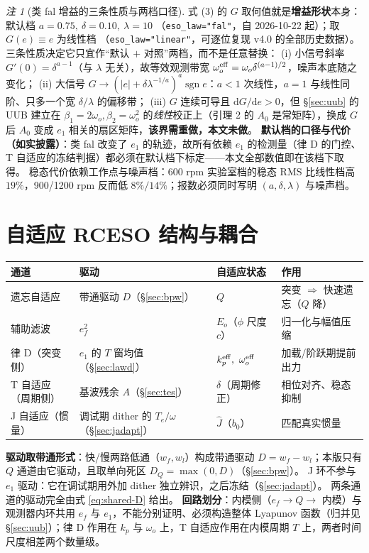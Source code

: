 \documentclass[11pt,a4paper]{article}
\theoremstyle{remark}\newtheorem{remark}{注}
\newcommand{\ef}{e_f}
\begin{document}
\begin{remark}[类 fal 增益的三条性质与两档口径]\label{rem:fal-gain}
式 (3) 的 $G$ 取何值就是\textbf{增益形状}本身：默认档 $a=0.75,\ \delta=0.10,\ \lambda=10$
（\texttt{eso\_law="fal"}，自 2026-10-22 起）；取 $G(e)\equiv e$ 为线性档
（\texttt{eso\_law="linear"}，可逐位复现 v4.0 的全部历史数据）。
三条性质决定它只宜作“默认 $+$ 对照”两档，而不是任意替换：
(i) 小信号斜率 $G'(0)=\delta^{a-1}$（与 $\lambda$ 无关），故等效观测带宽 $\omega_o^{\rm eff}=\omega_o\delta^{(a-1)/2}$，噪声本底随之变化；
(ii) 大信号 $G\to(|e|+\delta\lambda^{-1/a})^{a}\operatorname{sgn}e$：$a<1$ 次线性，$a=1$ 与线性同阶、只多一个宽 $\delta/\lambda$ 的偏移带；
(iii) $G$ 连续可导且 $\mathrm dG/\mathrm de>0$，但 \S\ref{sec:uub} 的 UUB 建立在 $\beta_1=2\omega_o,\beta_2=\omega_o^2$ 的\emph{线性}校正上（引理 2 的 $A_0$ 是常矩阵），换成 $G$ 后 $A_0$ 变成 $e_1$ 相关的扇区矩阵，\textbf{该界需重做，本文未做}。
\textbf{默认档的口径与代价（如实披露）}：类 fal 改变了 $e_1$ 的轨迹，故所有依赖 $e_1$ 的检测量（律 D 的门控、T 自适应的冻结判据）都必须在默认档下标定——本文全部数值即在该档下取得。
稳态代价依赖工作点与噪声档：600 rpm 实验室档的稳态 RMS 比线性档高 $19\%$，900/1200 rpm 反而低 $8\%/14\%$；报数必须同时写明 $(a,\delta,\lambda)$ 与噪声档。
\end{remark}
\section{自适应 RCESO 结构与耦合}\label{sec:arch}
\begin{center}
\footnotesize
\begin{tabular}{@{}llll@{}}
\toprule
通道 & 驱动 & 自适应状态 & 作用\\
\midrule
遗忘自适应 & 带通驱动 $D$（\S\ref{sec:bpw}） & $Q$ & 突变 $\Rightarrow$ 快速遗忘（$Q$ 降）\\
辅助滤波 & $\ef^{2}$ & $E_o$（$\phi$ 尺度 $c$） & 归一化与幅值压缩\\
律 D（突变侧） & $e_1$ 的 $T$ 窗均值（\S\ref{sec:lawd}） & $k_p^{\rm eff},\ \omega_o^{\rm eff}$ & 加载/阶跃期提前出力 \\
T 自适应（周期侧） & 基波残余 $A$（\S\ref{sec:tes}） & $\delta$（周期修正） & 相位对齐、稳态抑制 \\
J 自适应（惯量） & 调试期 dither 的 $T_e/\omega$（\S\ref{sec:jadapt}） & $\hat J$（$b_0$） & 匹配真实惯量 \\
\bottomrule
\end{tabular}
\end{center}
\noindent\textbf{驱动取带通形式}：快/慢两路低通（$w_f,w_l$）构成带通驱动 $D=w_f-w_l$；本版只有 $Q$ 通道由它驱动，且取单向死区 $D_Q=\max(0,D)$（\S\ref{sec:bpw}）。
J 环不参与 $e_1$ 驱动：它在调试期用外加 dither 独立辨识，之后冻结（\S\ref{sec:jadapt}）。
两条通道的驱动完全由式 \eqref{eq:shared-D} 给出。
\noindent\textbf{回路划分}：内模侧（$\ef\to Q\to$ 内模）与观测器内环共用 $\ef$ 与 $e_1$，不能分别证明、必须构造整体 Lyapunov 函数（归并见 §\ref{sec:uub}）；律 D 作用在 $k_p$ 与 $\omega_o$ 上，T 自适应作用在内模周期 $T$ 上，两者时间尺度相差两个数量级。
\end{document}
